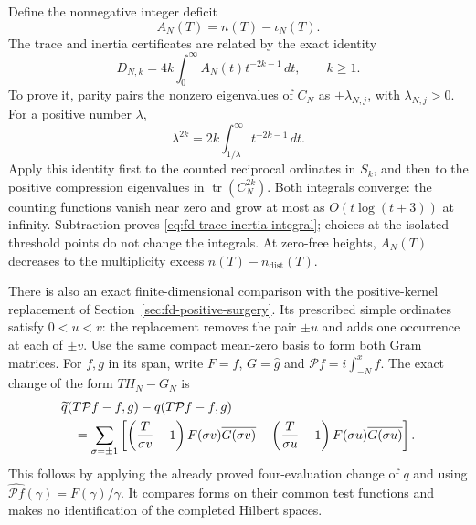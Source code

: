 Define the nonnegative integer deficit
\[
 A_N(T)=n(T)-\iota_N(T).
\]
The trace and inertia certificates are related by the exact identity
\begin{equation}\label{eq:fd-trace-inertia-integral}
 D_{N,k}=4k\int_0^\infty A_N(t)t^{-2k-1}\,dt,
 \qquad k\ge1.
\end{equation}
To prove it, parity pairs the nonzero eigenvalues of \(C_N\)
as \(\pm\lambda_{N,j}\), with \(\lambda_{N,j}>0\). For a
positive number \(\lambda\),
\[
 \lambda^{2k}=2k\int_{1/\lambda}^{\infty}t^{-2k-1}\,dt.
\]
Apply this identity first to the counted reciprocal ordinates in
\(S_k\), and then to the positive compression eigenvalues in
\(\operatorname{tr}(C_N^{2k})\). Both integrals converge:
the counting functions vanish near zero and grow at most as
\(O(t\log(t+3))\) at infinity. Subtraction proves
\eqref{eq:fd-trace-inertia-integral}; choices at the isolated
threshold points do not change the integrals. At zero-free heights,
\(A_N(T)\) decreases to the multiplicity excess
\(n(T)-n_{\mathrm{dist}}(T)\).

There is also an exact finite-dimensional comparison with the
positive-kernel replacement of
Section~\ref{sec:fd-positive-surgery}. Its prescribed simple
ordinates satisfy \(0<u<v\): the replacement removes the pair
\(\pm u\) and adds one occurrence at each of \(\pm v\).
Use the same compact mean-zero basis to form both Gram matrices.
For \(f,g\) in its span, write \(F=\widehat f\), \(G=\widehat g\)
and \(\mathcal P f=i\int_{-N}^{x}f\). The exact change of the
form \(T H_N-G_N\) is
\begin{align}
 &\widetilde q(T\mathcal P f-f,g)-q(T\mathcal P f-f,g)
 \notag\\
 &\quad=\sum_{\sigma=\pm1}\left[
  \left(\frac{T}{\sigma v}-1\right)
            F(\sigma v)\overline{G(\sigma v)}
 -\left(\frac{T}{\sigma u}-1\right)
            F(\sigma u)\overline{G(\sigma u)}\right].
 \label{eq:fd-inertia-surgery}
\end{align}
This follows by applying the already proved four-evaluation change
of \(q\) and using
\(\widehat{\mathcal P f}(\gamma)=F(\gamma)/\gamma\).
It compares forms on their common test functions and makes no
identification of the completed Hilbert spaces.

